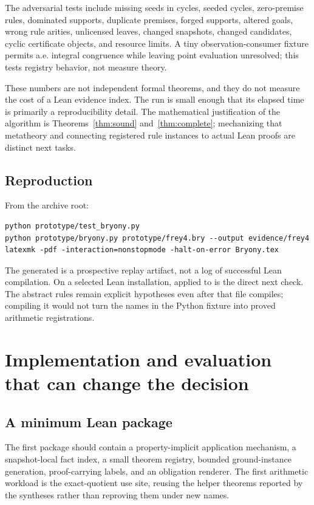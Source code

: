 \documentclass[11pt,a4paper]{article}
\newcommand{\code}[1]{\texttt{\detokenize{#1}}}
\theoremstyle{definition}\newtheorem{definition}[theorem]{Definition}
\theoremstyle{remark}\newtheorem{remark}[theorem]{Remark}
\begin{document}
The adversarial tests include missing seeds in cycles, seeded cycles, zero-premise rules, dominated supports, duplicate premises, forged supports, altered goals, wrong rule arities, unlicensed leaves, changed snapshots, changed candidates, cyclic certificate objects, and resource limits. A tiny observation-consumer fixture permits a.e. integral congruence while leaving point evaluation unresolved; this tests registry behavior, not measure theory.

These numbers are not independent formal theorems, and they do not measure the cost of a Lean evidence index. The run is small enough that its elapsed time is primarily a reproducibility detail. The mathematical justification of the algorithm is Theorems~\ref{thm:sound} and~\ref{thm:complete}; mechanizing that metatheory and connecting registered rule instances to actual Lean proofs are distinct next tasks.

\subsection{Reproduction}
From the archive root:
\begin{lstlisting}
python prototype/test_bryony.py
python prototype/bryony.py prototype/frey4.bry --output evidence/frey4
latexmk -pdf -interaction=nonstopmode -halt-on-error Bryony.tex
\end{lstlisting}
The generated \code{evidence/frey4/Requirements.lean} is a prospective replay artifact, not a log of successful Lean compilation. On a selected Lean installation, \code{lean} applied to  is the direct next check. The abstract rules remain explicit hypotheses even after that file compiles; compiling it would not turn the names in the Python fixture into proved arithmetic registrations.

\section{Implementation and evaluation that can change the decision}\label{sec:evaluation}

\subsection{A minimum Lean package}
The first package should contain a property-implicit application mechanism, a snapshot-local fact index, a small theorem registry, bounded ground-instance generation, proof-carrying labels, and an obligation renderer. The first arithmetic workload is the exact-quotient use site, reusing the helper theorems reported by the syntheses rather than reproving them under new names.
\end{document}
